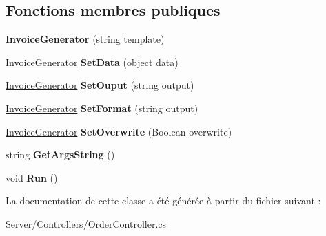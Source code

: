\subsection*{Fonctions membres publiques}
\begin{DoxyCompactItemize}
\item 
\mbox{\label{class_invoice_generator_af0aecfce846edec2326a676e7cb2fae9}} 
{\bfseries Invoice\+Generator} (string template)
\item 
\mbox{\label{class_invoice_generator_a9f45e54d5e55e872d966a87b2a3356ee}} 
\hyperlink{class_invoice_generator}{Invoice\+Generator} {\bfseries Set\+Data} (object data)
\item 
\mbox{\label{class_invoice_generator_aa2ac7afb4098da12835f57e7983ea985}} 
\hyperlink{class_invoice_generator}{Invoice\+Generator} {\bfseries Set\+Ouput} (string output)
\item 
\mbox{\label{class_invoice_generator_a68e7c8475b1f0db52af8ce5d55fd6f42}} 
\hyperlink{class_invoice_generator}{Invoice\+Generator} {\bfseries Set\+Format} (string output)
\item 
\mbox{\label{class_invoice_generator_ae58d1b23ae772c696b9aa87c5bec1982}} 
\hyperlink{class_invoice_generator}{Invoice\+Generator} {\bfseries Set\+Overwrite} (Boolean overwrite)
\item 
\mbox{\label{class_invoice_generator_a8e81b9a2957caa8c5287b123d44da37d}} 
string {\bfseries Get\+Args\+String} ()
\item 
\mbox{\label{class_invoice_generator_a81c290bfd7ba1cf7ec56abc95078d908}} 
void {\bfseries Run} ()
\end{DoxyCompactItemize}


La documentation de cette classe a été générée à partir du fichier suivant \+:\begin{DoxyCompactItemize}
\item 
Server/\+Controllers/Order\+Controller.\+cs\end{DoxyCompactItemize}
